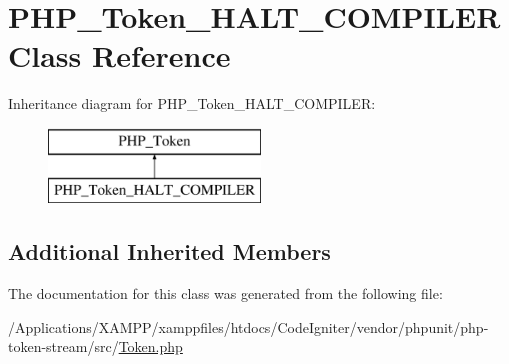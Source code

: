 \hypertarget{class_p_h_p___token___h_a_l_t___c_o_m_p_i_l_e_r}{}\section{P\+H\+P\+\_\+\+Token\+\_\+\+H\+A\+L\+T\+\_\+\+C\+O\+M\+P\+I\+L\+ER Class Reference}
\label{class_p_h_p___token___h_a_l_t___c_o_m_p_i_l_e_r}
Inheritance diagram for P\+H\+P\+\_\+\+Token\+\_\+\+H\+A\+L\+T\+\_\+\+C\+O\+M\+P\+I\+L\+ER\+:\begin{figure}[H]
\begin{center}
\leavevmode
\includegraphics[height=2.000000cm]{class_p_h_p___token___h_a_l_t___c_o_m_p_i_l_e_r}
\end{center}
\end{figure}
\subsection*{Additional Inherited Members}


The documentation for this class was generated from the following file\+:\begin{DoxyCompactItemize}
\item 
/\+Applications/\+X\+A\+M\+P\+P/xamppfiles/htdocs/\+Code\+Igniter/vendor/phpunit/php-\/token-\/stream/src/\mbox{\hyperlink{_token_8php}{Token.\+php}}\end{DoxyCompactItemize}
